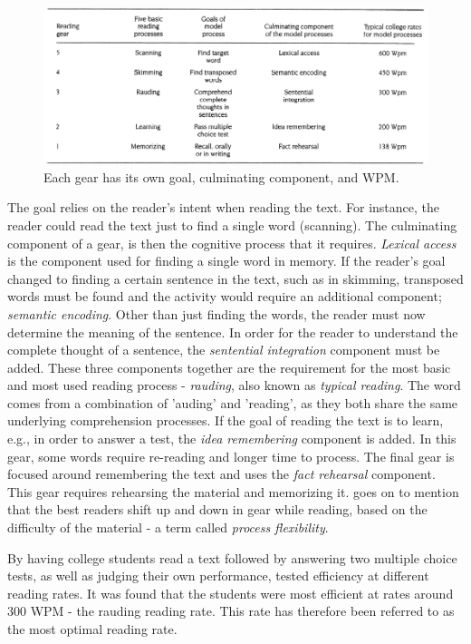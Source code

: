 \begin{figure}[htbp]
\centering
\captionsetup{justification=centering}
\includegraphics[width=1\textwidth]{Pics/gears_list}
\caption{Each gear has its own goal, culminating component, and WPM. \protect\cite{carver_reading_1992}}
\label{fig:gears_list}
\end{figure}

The goal relies on the reader's intent when reading the text. For instance, the reader could read the text just to find a single word (scanning). The culminating component of a gear, is then the cognitive process that it requires. \textit{Lexical access} is the component used for finding a single word in memory. If the reader's goal changed to finding a certain sentence in the text, such as in skimming, transposed words must be found and the activity would require an additional component; \textit{semantic encoding}. Other than just finding the words, the reader must now determine the meaning of the sentence. In order for the reader to understand the complete thought of a sentence, the \textit{sentential integration} component must be added. These three components together are the requirement for the most basic and most used reading process - \textit{rauding}, also known as \textit{typical reading}. The word comes from a combination of 'auding' and 'reading', as they both share the same underlying comprehension processes. If the goal of reading the text is to learn, e.g., in order to answer a test, the \textit{idea remembering} component is added. In this gear, some words require re-reading and longer time to process. The final gear is focused around remembering the text and uses the \textit{fact rehearsal} component. This gear requires rehearsing the material and memorizing it. 
 goes on to mention that the best readers shift up and down in gear while reading, based on the difficulty of the material - a term called \textit{process flexibility}. 

By having college students read a text followed by answering two multiple choice tests, as well as judging their own performance, \citeauthor{carver_reading_1992} tested efficiency at different reading rates. It was found that the students were most efficient at rates around 300 WPM - the rauding reading rate. This rate has therefore been referred to as the most optimal reading rate.

